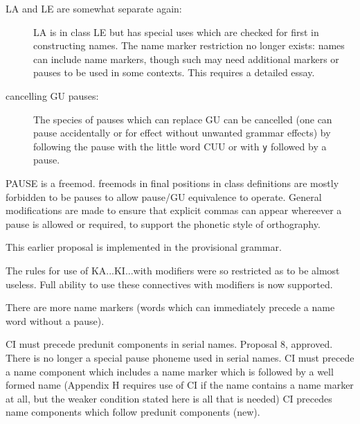 \documentclass[12pt]{article}
\begin{document}
\begin{description}
\begin{description}
\item[LA and LE are somewhat separate again:]  LA is in class LE but has special uses which are checked for first in constructing names.
The name marker restriction no longer exists:  names can include name markers, though such may need additional markers or pauses to be used
in some contexts.   This requires a detailed essay.

\item[cancelling GU pauses:]  The species of pauses which can replace GU can be cancelled (one can pause accidentally or for effect
without unwanted grammar effects) by following the pause with the little word CUU or with {\tt y} followed by a pause.

\end{description}

\item[Subproposals found in the grammar section:]

\begin{description}

\item

\item[PAUSE:]  PAUSE is a freemod.  freemods in final positions in class definitions are mostly forbidden to
be pauses to allow pause/GU equivalence to operate.  General modifications are made to ensure that explicit
commas can appear whereever a pause is allowed or required, to support the phonetic style of orthography.

\item[linking modifiers with JE and JUE:]  This earlier proposal is implemented in the provisional grammar.

\item[full use of forethought connectives on modifiers:]  The rules for use of KA...KI...with modifiers were so restricted as to be almost useless.
Full ability to use these connectives with modifiers is now supported.

\item[name marker list extended:]  There are more name markers (words which can immediately precede a name word without a pause).

\item[serial name repair:]   CI must precede predunit components in serial names.  Proposal 8, approved.  There is no longer a special pause phoneme used
in serial names.  CI must precede a name component which includes a name marker  which is followed by a well formed name (Appendix H requires use of CI if the name contains a name marker at all, but the weaker condition stated here is all that is needed)  CI precedes name components which follow predunit components (new).


\end{description}
\end{description}
\end{document}

